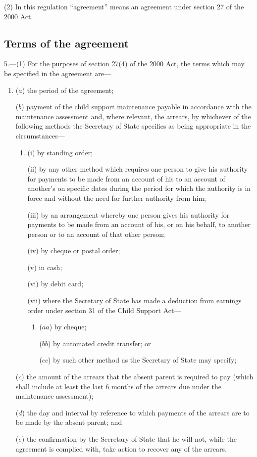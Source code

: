 \documentclass[12pt,a4paper]{article}
\begin{document}
(2) In this regulation “agreement” means an agreement under section 27 of the 2000 Act.

\subsection[5. Terms of the agreement]{Terms of the agreement}

5.---(1)  For the purposes of section 27(4) of the 2000 Act, the terms which may be specified in the agreement are—
\begin{enumerate}\item[]
($a$) the period of the agreement;

($b$) payment of the child support maintenance payable in accordance with the maintenance assessment and, where relevant, the arrears, by whichever of the following methods the Secretary of State specifies as being appropriate in the circumstances—
\begin{enumerate}\item[]
(i) by standing order;

(ii) by any other method which requires one person to give his authority for payments to be made from an account of his to an account of another’s on specific dates during the period for which the authority is in force and without the need for further authority from him;

(iii) by an arrangement whereby one person gives his authority for payments to be made from an account of his, or on his behalf, to another person or to an account of that other person;

(iv) by cheque or postal order;

(v) in cash;

(vi) by debit card;

(vii) where the Secretary of State has made a deduction from earnings order under section 31 of the Child Support Act—
\begin{enumerate}\item[]
($aa$) by cheque;

($bb$) by automated credit transfer; or

($cc$) by such other method as the Secretary of State may specify;
\end{enumerate}
\end{enumerate}

($c$) the amount of the arrears that the absent parent is required to pay (which shall include at least the last 6 months of the arrears due under the maintenance assessment);

($d$) the day and interval by reference to which payments of the arrears are to be made by the absent parent; and

($e$) the confirmation by the Secretary of State that he will not, while the agreement is complied with, take action to recover any of the arrears.
\end{enumerate}
\end{document}
